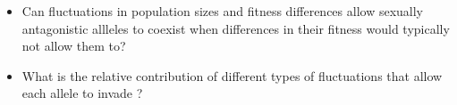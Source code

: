 \documentclass[../main.tex]{subfiles}
\begin{document}
\begin{itemize}
	\item Can fluctuations in population sizes and fitness differences allow sexually antagonistic allleles to coexist when differences in their fitness would typically not allow them to?
	\item What is the relative contribution of different types of fluctuations that allow each allele to invade ?
\end{itemize}

\end{document}
